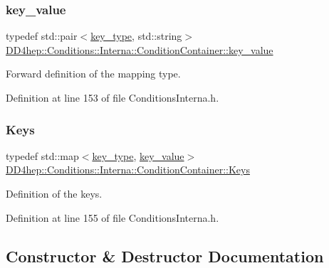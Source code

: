 \subsubsection{\texorpdfstring{key\+\_\+value}{key\_value}}
{\footnotesize\ttfamily typedef std\+::pair$<$\hyperlink{class_d_d4hep_1_1_conditions_1_1_interna_1_1_condition_container_a7a4545b4b0536565feb7346bd97c63fa}{key\+\_\+type}, std\+::string$>$ \hyperlink{class_d_d4hep_1_1_conditions_1_1_interna_1_1_condition_container_a2a8452e68d48eb94553607e7d7ae13f6}{D\+D4hep\+::\+Conditions\+::\+Interna\+::\+Condition\+Container\+::key\+\_\+value}}



Forward definition of the mapping type. 



Definition at line 153 of file Conditions\+Interna.\+h.

\hypertarget{class_d_d4hep_1_1_conditions_1_1_interna_1_1_condition_container_a01f9461850ee260a6c76646f9619c8bb}{}\label{class_d_d4hep_1_1_conditions_1_1_interna_1_1_condition_container_a01f9461850ee260a6c76646f9619c8bb} 
\subsubsection{\texorpdfstring{Keys}{Keys}}
{\footnotesize\ttfamily typedef std\+::map$<$\hyperlink{class_d_d4hep_1_1_conditions_1_1_interna_1_1_condition_container_a7a4545b4b0536565feb7346bd97c63fa}{key\+\_\+type}, \hyperlink{class_d_d4hep_1_1_conditions_1_1_interna_1_1_condition_container_a2a8452e68d48eb94553607e7d7ae13f6}{key\+\_\+value}$>$ \hyperlink{class_d_d4hep_1_1_conditions_1_1_interna_1_1_condition_container_a01f9461850ee260a6c76646f9619c8bb}{D\+D4hep\+::\+Conditions\+::\+Interna\+::\+Condition\+Container\+::\+Keys}}



Definition of the keys. 



Definition at line 155 of file Conditions\+Interna.\+h.



\subsection{Constructor \& Destructor Documentation}
\hypertarget{class_d_d4hep_1_1_conditions_1_1_interna_1_1_condition_container_a766c849d73bfff4a401fc002a75c7594}{}\label{class_d_d4hep_1_1_conditions_1_1_interna_1_1_condition_container_a766c849d73bfff4a401fc002a75c7594} 
